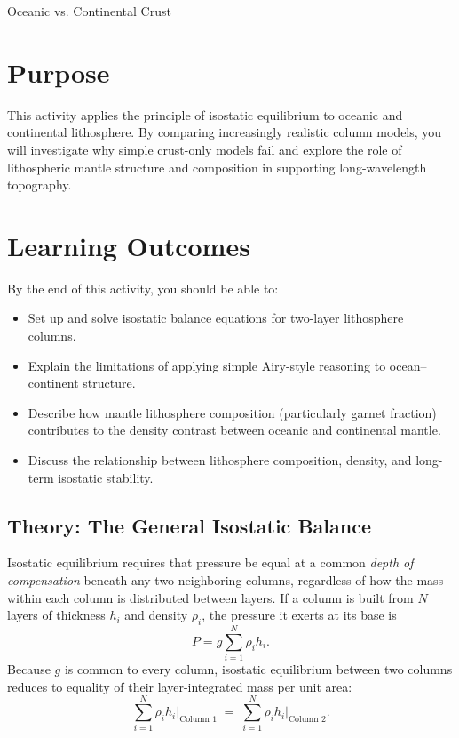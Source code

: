 \begin{activity}{Oceanic vs. Continental Crust}

\section*{Purpose}

This activity applies the principle of isostatic equilibrium to oceanic and continental lithosphere. By comparing increasingly realistic column models, you will investigate why simple crust-only models fail and explore the role of lithospheric mantle structure and composition in supporting long-wavelength topography.

\section*{Learning Outcomes}

By the end of this activity, you should be able to:
\begin{itemize}
  \item Set up and solve isostatic balance equations for two-layer lithosphere columns.
  \item Explain the limitations of applying simple Airy-style reasoning to ocean--continent structure.
  \item Describe how mantle lithosphere composition (particularly garnet fraction) contributes to the density contrast between oceanic and continental mantle.
  \item Discuss the relationship between lithosphere composition, density, and long-term isostatic stability.
\end{itemize}

\subsection*{Theory: The General Isostatic Balance}

Isostatic equilibrium requires that pressure be equal at a common \emph{depth of compensation} beneath any two neighboring columns, regardless of how the mass within each column is distributed between layers. If a column is built from $N$ layers of thickness $h_i$ and density $\rho_i$, the pressure it exerts at its base is
\[
    P = g \sum_{i=1}^{N} \rho_i h_i .
\]
Because $g$ is common to every column, isostatic equilibrium between two columns reduces to equality of their layer-integrated mass per unit area:
\[
    \sum_{i=1}^{N} \rho_{i} h_{i} \Big|_{\text{Column 1}}
    \;=\;
    \sum_{i=1}^{N} \rho_{i} h_{i} \Big|_{\text{Column 2}} .
\]


\end{activity}
